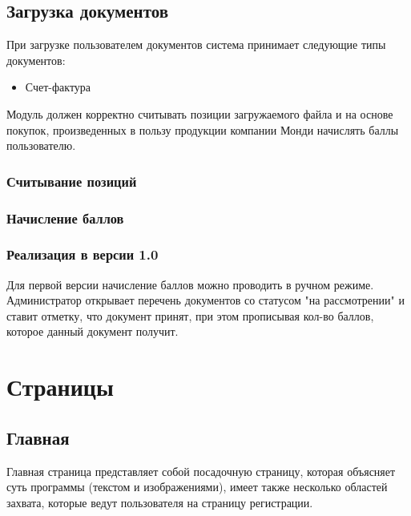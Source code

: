 \documentclass[DIV=calc, paper=a4, fontsize=11pt]{scrartcl} %
\begin{document}
\subsection{Загрузка документов}

При загрузке пользователем документов система принимает следующие типы документов:

\begin{itemize}
	\item Счет-фактура
\end{itemize}

Модуль должен корректно считывать позиции загружаемого файла и на основе покупок, произведенных в пользу продукции компании Монди начислять баллы пользователю.

\subsubsection{Считывание позиций}

\subsubsection{Начисление баллов}

\subsubsection{Реализация в версии 1.0}
Для первой версии начисление баллов можно проводить в ручном режиме. Администратор открывает перечень документов со статусом "на рассмотрении" и ставит отметку, что документ принят, при этом прописывая кол-во баллов, которое данный документ получит.

\section{Страницы}

\subsection{Главная}

Главная страница представляет собой посадочную страницу, которая объясняет суть программы (текстом и изображениями), имеет также несколько областей захвата, которые ведут пользователя на страницу регистрации.
\end{document}
